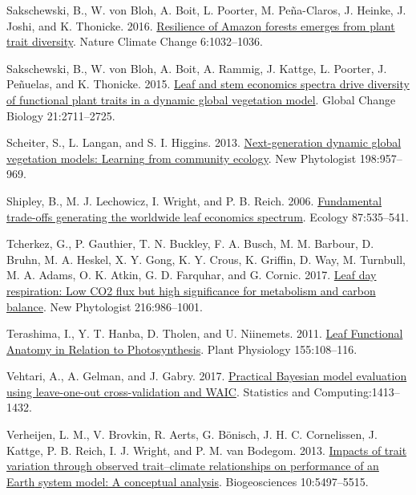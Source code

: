 \documentclass[
  12pt,
  letterpaper,
  DIV=11,
  numbers=noendperiod]{scrartcl}
\newlength{\cslhangindent}
\newlength{\cslentryspacingunit} %
\newenvironment{CSLReferences}[2] %
 {%
  \setlength{\parindent}{0pt}
  \ifodd #1
  \let\oldpar\par
  \def\par{\hangindent=\cslhangindent\oldpar}
  \fi
  \setlength{\parskip}{#2\cslentryspacingunit}
 }%
 {}
\begin{document}
\begin{CSLReferences}{1}{0}
\leavevmode{}%
Sakschewski, B., W. von Bloh, A. Boit, L. Poorter, M. Peña-Claros, J.
Heinke, J. Joshi, and K. Thonicke. 2016.
\href{https://doi.org/10.1038/nclimate3109}{Resilience of {Amazon}
forests emerges from plant trait diversity}. Nature Climate Change
6:1032--1036.

\leavevmode{}%
Sakschewski, B., W. von Bloh, A. Boit, A. Rammig, J. Kattge, L. Poorter,
J. Peñuelas, and K. Thonicke. 2015.
\href{https://doi.org/10.1111/gcb.12870}{Leaf and stem economics spectra
drive diversity of functional plant traits in a dynamic global
vegetation model}. Global Change Biology 21:2711--2725.

\leavevmode{}%
Scheiter, S., L. Langan, and S. I. Higgins. 2013.
\href{https://doi.org/10.1111/nph.12210}{Next-generation dynamic global
vegetation models: {Learning} from community ecology}. New Phytologist
198:957--969.

\leavevmode{}%
Shipley, B., M. J. Lechowicz, I. Wright, and P. B. Reich. 2006.
\href{https://doi.org/10.1890/05-1051}{Fundamental trade-offs generating
the worldwide leaf economics spectrum}. Ecology 87:535--541.

\leavevmode{}%
Tcherkez, G., P. Gauthier, T. N. Buckley, F. A. Busch, M. M. Barbour, D.
Bruhn, M. A. Heskel, X. Y. Gong, K. Y. Crous, K. Griffin, D. Way, M.
Turnbull, M. A. Adams, O. K. Atkin, G. D. Farquhar, and G. Cornic. 2017.
\href{https://doi.org/10.1111/nph.14816}{Leaf day respiration: Low {CO2}
flux but high significance for metabolism and carbon balance}. New
Phytologist 216:986--1001.

\leavevmode{}%
Terashima, I., Y. T. Hanba, D. Tholen, and U. Niinemets. 2011.
\href{https://doi.org/10.1104/pp.110.165472}{Leaf {Functional Anatomy}
in {Relation} to {Photosynthesis}}. Plant Physiology 155:108--116.

\leavevmode{}%
Vehtari, A., A. Gelman, and J. Gabry. 2017.
\href{https://doi.org/10.1007/s11222-016-9696-4}{Practical {Bayesian}
model evaluation using leave-one-out cross-validation and {WAIC}}.
Statistics and Computing:1413--1432.

\leavevmode{}%
Verheijen, L. M., V. Brovkin, R. Aerts, G. Bönisch, J. H. C.
Cornelissen, J. Kattge, P. B. Reich, I. J. Wright, and P. M. van
Bodegom. 2013. \href{https://doi.org/10.5194/bg-10-5497-2013}{Impacts of
trait variation through observed trait--climate relationships on
performance of an {Earth} system model: A conceptual analysis}.
Biogeosciences 10:5497--5515.


\end{CSLReferences}
\end{document}
